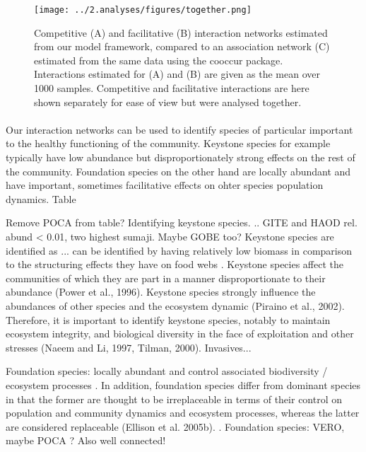 \documentclass[a4,12pt]{article}
\begin{document}
    \begin{figure}[H]
        \hspace*{-2cm}
        \texttt{[image: ../2.analyses/figures/together.png]}
        \caption{Competitive (A) and facilitative (B) interaction networks estimated from our model framework, compared to an association network (C) estimated from the same data using the cooccur package. Interactions estimated for (A) and (B) are given as the mean over 1000 samples. Competitive and facilitative interactions are here shown separately for ease of view but were analysed together.}
        \label{fig:netwks}
    \end{figure}    

    \paragraph{} 
    Our interaction networks can be used to identify species of particular important to the healthy functioning of the community. Keystone species for example typically have low abundance but disproportionately strong effects on the rest of the community. Foundation species on the other hand are locally abundant and have important, sometimes facilitative effects on ohter species population dynamics. Table 



    Remove POCA from table?
    Identifying keystone species. .. GITE and HAOD rel. abund < 0.01, two highest sumaji. Maybe GOBE  too? Keystone species are identified as ... can be identified by having relatively low biomass in comparison to the structuring effects they have on food webs \citep{Libralato2006}. 
    Keystone species affect the communities of which they are part in a manner disproportionate to their abundance (Power et al., 1996). Keystone species strongly influence the abundances of other species and the ecosystem dynamic (Piraino et al., 2002). Therefore, it is important to identify keystone species, notably to maintain ecosystem integrity, and biological diversity in the face of exploitation and other stresses (Naeem and Li, 1997, Tilman, 2000).
    Invasives...

    Foundation species: locally abundant and control associated biodiversity / ecosystem processes \citep{Baiser2013}. In addition, foundation species differ from dominant species in that the former are thought to be irreplaceable in terms of their control on population and community dynamics and ecosystem processes, whereas the latter are considered replaceable (Ellison et al. 2005b). \citep{Ellison2005}. Foundation species: VERO, maybe POCA ? Also well connected! 
\end{document}
